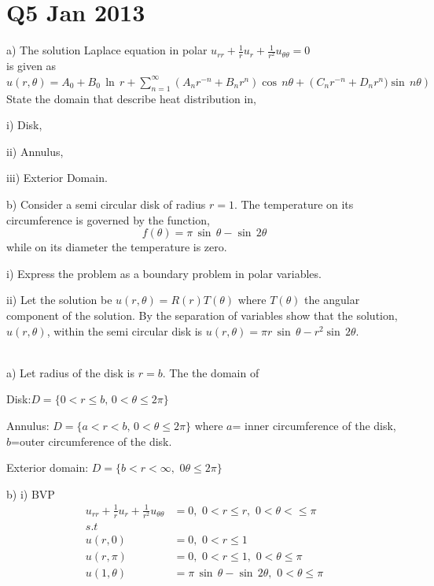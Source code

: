 \section{Q5 Jan 2013}
\begin{description}
\item a) The solution Laplace equation in polar
$u_{rr}+\frac{1}{r}u_r+\frac{1}{r^2}u_{\theta\theta}=0$\\
is given as\\
$u(r,\theta)=A_0+B_0\,\ln\,r+ \sum_{n=1}^\infty\left(A_nr^{-n}+B_nr^n\right)\cos\,n\theta+\left(C_nr^{-n}+D_nr^n)\sin\,n\theta\right)$\\
State the domain that describe heat distribution in,
\begin{description}
\item i) Disk,
\item ii) Annulus,
\item iii) Exterior Domain.
\end{description}
\item b) Consider a semi circular disk of radius $r=1$. The temperature on its circumference is governed by the function,
$$f(\theta)=\pi\,\sin\,\theta-\sin\,2\theta $$
while on its diameter the temperature is zero.
\begin{description}
\item i) Express the problem as a boundary problem in polar variables.
\item ii) Let the solution be $u(r,\theta)=R(r)T(\theta)$ where $T(\theta)$ the angular component of the solution. By the separation of variables show that the solution, $u(r,\theta)$, within the semi circular disk is $u(r,\theta)=\pi r\,\sin\,\theta-r^2\sin\,2\theta$.
\end{description}
\end{description}
\\
a) Let radius of the disk is $r=b$. The the domain of 
\begin{description}
\item Disk:$ D=\{0<r\le b,\,0<\theta\le 2\pi\}$
\item Annulus: $D=\{a<r<b,\,0<\theta\le 2\pi\}$ where $a$= inner circumference of the disk, $b$=outer circumference of the disk.
\item Exterior domain: $D=\{b<r<\infty,\,\,0\theta\le 2\pi\}$
\end{description}
b) i) BVP
\begin{align*}
u_{rr}+\frac{1}{r}u_r+\frac{1}{r^2}u_{\theta\theta}&=0,\,\,0<r\le r,\,\,0<\theta<\le \pi\\
s.t\hspace{2cm}&\\
u(r,0)&=0,\,\,0<r\le 1\\
u(r,\pi)&=0,\,\,0<r\le 1,\,\,0<\theta\le \pi\\
u(1,\theta)&=\pi\,\sin\,\theta-\sin\,2\theta,\,\,0<\theta\le\pi
\end{align*}
